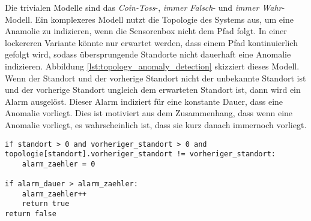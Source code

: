 Die trivialen Modelle sind das \textit{Coin-Toss}-, \textit{immer Falsch}- und \textit{immer Wahr}-Modell.
Ein komplexeres Modell nutzt die Topologie des Systems aus, um eine Anamolie zu indizieren, wenn die Sensorenbox nicht dem Pfad folgt.
In einer lockereren Variante könnte nur erwartet werden, dass einem Pfad kontinuierlich gefolgt wird,
sodass übersprungende Standorte nicht dauerhaft eine Anomalie indizieren.
Abbildung \ref{lst:topology_anomaly_detection} skizziert dieses Modell.
Wenn der Standort und der vorherige Standort nicht der unbekannte Standort ist und
der vorherige Standort ungleich dem erwarteten Standort ist, dann wird ein Alarm ausgelöst.
Dieser Alarm indiziert für eine konstante Dauer, dass eine Anomalie vorliegt.
Dies ist motiviert aus dem Zusammenhang, dass wenn eine Anomalie vorliegt, es wahrscheinlich ist, dass sie kurz danach immernoch vorliegt.
\begin{lstlisting}[label=lst:topology_anomaly_detection, caption={Skizze des Modells zur Anamolieerkennung auf Basis der Topologie.}]
if standort > 0 and vorheriger_standort > 0 and topologie[standort].vorheriger_standort != vorheriger_standort:
    alarm_zaehler = 0

if alarm_dauer > alarm_zaehler:
    alarm_zaehler++
    return true
return false
\end{lstlisting}
